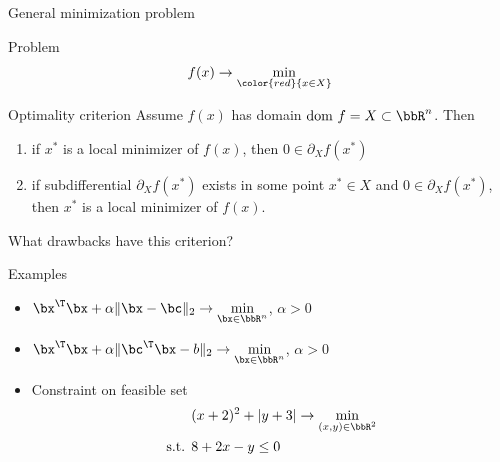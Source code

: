 \documentclass[12pt]{beamer}
\begin{document}
\begin{frame}{General minimization problem}

\begin{block}{Problem}
\[
f(x) \rightarrow \min\limits_{{\color{red}{x \in X}}}
\]
\end{block}

\begin{block}{Optimality criterion}
Assume $f(x)$ has domain $\mathrm{dom} \ f = X \subset \bbR^n$.
Then 
\begin{enumerate}
\item if $x^*$ is a local minimizer of $f(x)$, then $0 \in \partial_X f(x^*)$
\item if subdifferential $\partial_X f(x^*)$ exists in some point $x^* \in X$ and $0 \in \partial_X f(x^*)$, then $x^*$ is a local minimizer of $f(x)$.
\end{enumerate}
\end{block}
What drawbacks have this criterion?

\end{frame}

\begin{frame}{Examples}
\begin{itemize}
\item $\bx^{\T}\bx + \alpha \| \bx - 
\bc \|_2 \rightarrow \min\limits_{\bx \in \bbR^n}$, $\alpha > 0$
\item $\bx^{\T}\bx + \alpha \| \bc^{\T}\bx - 
b \|_2 \rightarrow \min\limits_{\bx \in \bbR^n}$, $\alpha > 0$
\item Constraint on feasible set
\begin{equation*}
\begin{split}
\vspace{-4mm}
&(x + 2)^2 + |y + 3| \rightarrow \min\limits_{(x, y) \in \bbR^2}\\
\text{s.t. }& 8 + 2x - y \leq 0
\end{split}
\end{equation*}
\end{itemize}
\end{frame}
\end{document}
